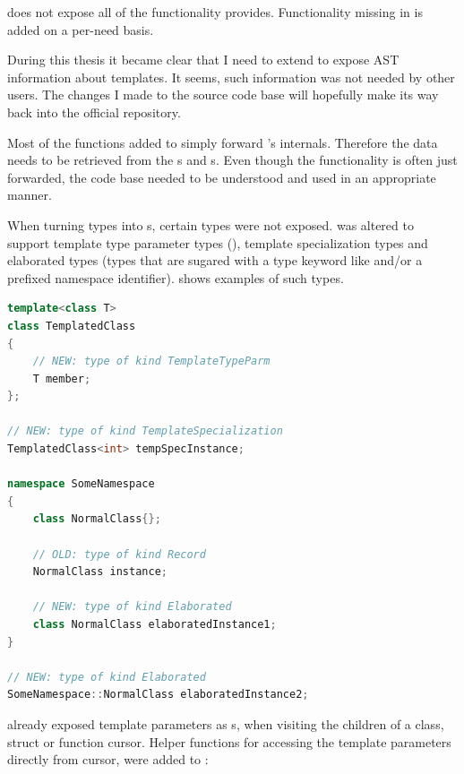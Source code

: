  does not expose all of the functionality  provides. Functionality missing in  is added on a per-need basis. 

During this thesis it became clear that I need to extend  to expose AST information about  templates. It seems, such information was not needed by other  users. The changes I made to the  source code base will hopefully make its way back into the official  repository.

Most of the functions added to  simply forward 's internals. Therefore the  data needs to be retrieved from the s and s. Even though the functionality is often just forwarded, the  code base needed to be understood and used in an appropriate  manner.

When turning  types into s, certain  types were not exposed.  was altered to support template type parameter types (), template specialization types and elaborated types (types that are sugared with a type keyword like  and/or a prefixed namespace identifier).  shows examples of such types.

\SingleSpacing
\begin{lstlisting}[language=C++, caption=Examples of types now supported by \myProperName{libclang}, label=lst:ClangNewTypes]
template<class T>
class TemplatedClass
{
	// NEW: type of kind TemplateTypeParm
	T member; 
};

// NEW: type of kind TemplateSpecialization
TemplatedClass<int> tempSpecInstance; 

namespace SomeNamespace
{	
	class NormalClass{};
	
	// OLD: type of kind Record
	NormalClass instance;
	
	// NEW: type of kind Elaborated
	class NormalClass elaboratedInstance1;
}

// NEW: type of kind Elaborated
SomeNamespace::NormalClass elaboratedInstance2; 
\end{lstlisting}
\OnehalfSpacing

 already exposed template parameters as s, when visiting the children of a class, struct or function cursor. Helper functions for accessing the template parameters directly from cursor, were added to :

